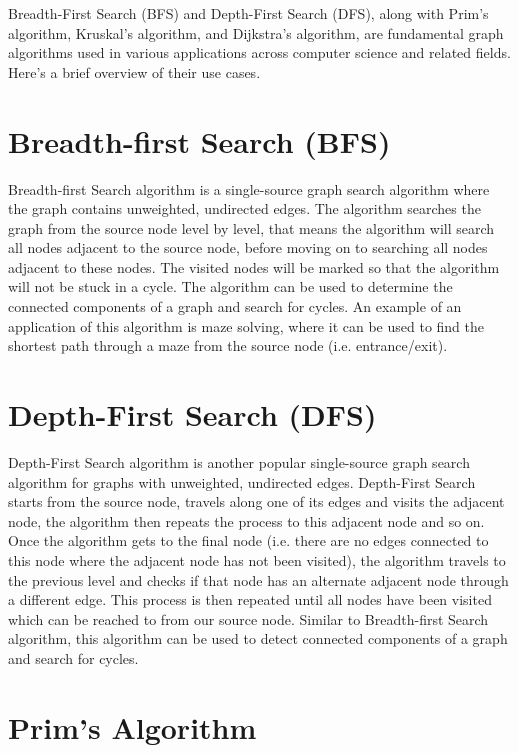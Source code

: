Breadth-First Search (BFS) and Depth-First Search (DFS), along with Prim's algorithm, Kruskal's algorithm, and Dijkstra's algorithm, are fundamental graph algorithms used in various applications across computer science and related fields. Here's a brief overview of their use cases.

\section{Breadth-first Search (BFS)}

Breadth-first Search algorithm is a single-source graph search algorithm where the graph contains unweighted, undirected edges. The algorithm searches the graph from the source node level by level, that means the algorithm will search all nodes adjacent to the source node, before moving on to searching all nodes adjacent to these nodes. The visited nodes will be marked so that the algorithm will not be stuck in a cycle. The algorithm can be used to determine the connected components of a graph and search for cycles. An example of an application of this algorithm is maze solving, where it can be used to find the shortest path through a maze from the source node (i.e. entrance/exit).

\section{Depth-First Search (DFS)}

Depth-First Search algorithm is another popular single-source graph search algorithm for graphs with unweighted, undirected edges. Depth-First Search starts from the source node, travels along one of its edges and visits the adjacent node, the algorithm then repeats the process to this adjacent node and so on. Once the algorithm gets to the final node (i.e. there are no edges connected to this node where the adjacent node has not been visited), the algorithm travels to the previous level and checks if that node has an alternate adjacent node through a different edge. This process is then repeated until all nodes have been visited which can be reached to from our source node. Similar to  Breadth-first Search algorithm, this algorithm can be used to detect connected components of a graph and search for cycles.

\section{Prim's Algorithm}

